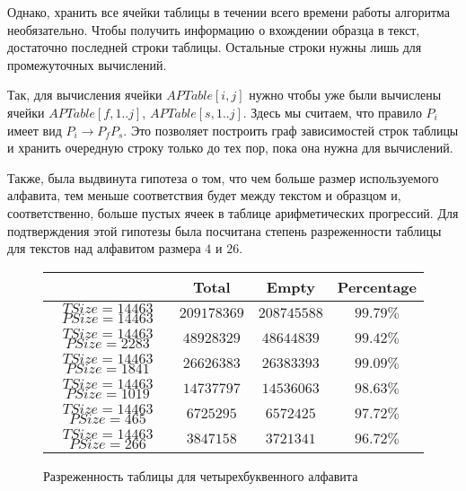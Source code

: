 \documentclass[14pt]{article}
\begin{document}
Однако, хранить все ячейки таблицы в течении всего времени работы алгоритма необязательно. Чтобы получить информацию о вхождении образца в текст, достаточно последней строки таблицы. Остальные строки нужны лишь для промежуточных вычислений.

Так, для вычисления ячейки $APTable[i, j]$ нужно чтобы уже были вычислены ячейки $APTable[f, 1..j]$, 
$APTable[s, 1..j]$. Здесь мы считаем, что правило $P_i$ имеет вид $P_i \to P_f P_s$.
Это позволяет построить граф зависимостей строк таблицы и хранить очередную строку только до тех пор, пока она нужна для вычислений.

Также, была выдвинута гипотеза о том, что чем больше размер используемого алфавита, тем меньше соответствия будет между текстом и образцом и, соответственно, больше пустых ячеек в таблице арифметических прогрессий.
Для подтверждения этой гипотезы была посчитана степень разреженности таблицы для текстов над алфавитом размера $4$ и $26$.

\begin{figure}[h]
    \begin{center}
    \begin{tabular}{ | c | c | c | c |}
        \hline
          & Total & Empty & Percentage \\
        \hline
        $T Size = 14463$ $P Size = 14463$ & $209178369$ & $208745588$ & $99.79\%$\\
        \hline
        $T Size = 14463$ $P Size = 2283$ & $48928329$ & $48644839$ & $99.42\%$\\
        \hline
        $T Size = 14463$ $P Size = 1841$ & $26626383$ & $26383393$ & $99.09\%$\\
        \hline
        $T Size = 14463$ $P Size = 1019$ & $14737797$ & $14536063$ & $98.63\%$\\
        \hline
        $T Size = 14463$ $P Size = 465$ & $6725295$ & $6572425$ & $97.72\%$\\
        \hline
        $T Size = 14463$ $P Size = 266$ & $3847158$ & $3721341$ & $96.72\%$\\
        \hline
    \end{tabular}
    \end{center}
    \caption{Разреженность таблицы для четырехбуквенного алфавита}
    \label{four_letter_emptyness}
\end{figure}
\end{document}

